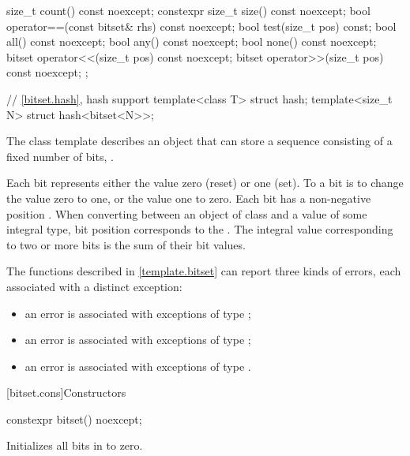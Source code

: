 \begin{codeblock}
{{    size_t count() const noexcept;
    constexpr size_t size() const noexcept;
    bool operator==(const bitset& rhs) const noexcept;
    bool test(size_t pos) const;
    bool all() const noexcept;
    bool any() const noexcept;
    bool none() const noexcept;
    bitset operator<<(size_t pos) const noexcept;
    bitset operator>>(size_t pos) const noexcept;
  };

  // \ref{bitset.hash}, hash support
  template<class T> struct hash;
  template<size_t N> struct hash<bitset<N>>;
}
\end{codeblock}

\pnum
The class template
describes an object that can store a sequence consisting of a fixed number of
bits, .

\pnum
Each bit represents either the value zero (reset) or one (set).
To
a bit is to change the value zero to one, or the value one to
zero.
Each bit has a non-negative position .
When converting
between an object of class
and a value of some
integral type, bit position  corresponds to the
.
The integral value corresponding to two
or more bits is the sum of their bit values.

\pnum
The functions described in \ref{template.bitset} can report three kinds of
errors, each associated with a distinct exception:
\begin{itemize}
\item
an
error is associated with exceptions of type
;
%
\item
an
error is associated with exceptions of type
;
%
\item
an
error is associated with exceptions of type
.
%
\end{itemize}

[bitset.cons]{Constructors}

%
\begin{itemdecl}
constexpr bitset() noexcept;
\end{itemdecl}

\begin{itemdescr}
\pnum
\effects
Initializes all bits in  to zero.
\end{itemdescr}

